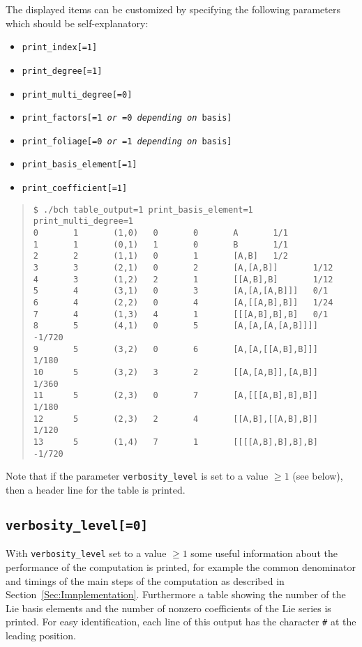\documentclass[11pt,a4paper]{article}
\begin{document}
The displayed items can be customized by specifying the following parameters
which should be self-explanatory:
\begin{itemize}
\item {\tt print\_index[=1]}
\item {\tt print\_degree[=1]}
\item {\tt print\_multi\_degree[=0]}
\item {\tt print\_factors[=1 {\em or} =0 {\em depending on} basis]}
\item {\tt print\_foliage[=0 {\em or} =1 {\em depending on} basis]}
\item {\tt print\_basis\_element[=1]}
\item {\tt print\_coefficient[=1]}
\end{itemize}
\begin{quote} %
{\small\begin{BVerbatim}
$ ./bch table_output=1 print_basis_element=1 print_multi_degree=1
0       1       (1,0)   0       0       A       1/1
1       1       (0,1)   1       0       B       1/1
2       2       (1,1)   0       1       [A,B]   1/2
3       3       (2,1)   0       2       [A,[A,B]]       1/12
4       3       (1,2)   2       1       [[A,B],B]       1/12
5       4       (3,1)   0       3       [A,[A,[A,B]]]   0/1
6       4       (2,2)   0       4       [A,[[A,B],B]]   1/24
7       4       (1,3)   4       1       [[[A,B],B],B]   0/1     
8       5       (4,1)   0       5       [A,[A,[A,[A,B]]]]       -1/720
9       5       (3,2)   0       6       [A,[A,[[A,B],B]]]       1/180
10      5       (3,2)   3       2       [[A,[A,B]],[A,B]]       1/360
11      5       (2,3)   0       7       [A,[[[A,B],B],B]]       1/180
12      5       (2,3)   2       4       [[A,B],[[A,B],B]]       1/120
13      5       (1,4)   7       1       [[[[A,B],B],B],B]       -1/720
\end{BVerbatim}
}\end{quote}
Note that if the parameter  \verb|verbosity_level| 
is set to a value $\geq 1$ (see below), then  a header line for the table 
is printed.

\subsection*{\tt verbosity\_level[=0]}
With \verb|verbosity_level| set to a value $\geq 1$ some useful information about
the performance of the computation is printed, for example the common denominator 
and timings of the main steps of the computation as described in Section~\ref{Sec:Imnplementation}. Furthermore a table showing the number of the
Lie basis elements and the number of nonzero coefficients of the Lie series is printed.
For easy identification, each line of this output has the character \verb|#| at the leading position.
\end{document}

